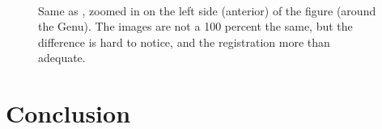 \documentclass[twocolumn]{svjour3}
\begin{document}
\begin{figure}[!t]
  \centering
    \\
  \caption{Same as , zoomed in on the left side (anterior) of
    the figure (around the Genu). The images are not a 100 percent the same, but the
    difference is hard to notice, and the registration more than adequate.}
  \label{fig:cc_slice_result_zoom}
\end{figure}




\section{Conclusion}
\end{document}
